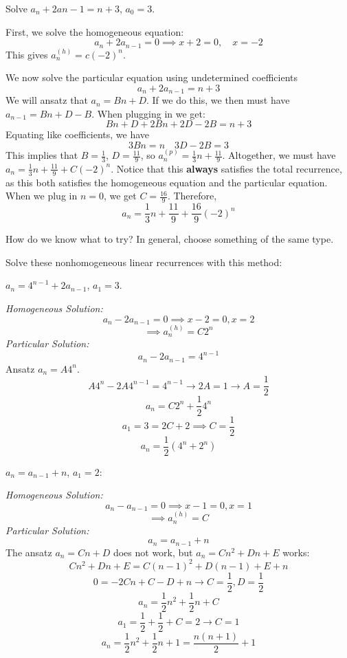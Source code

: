 \documentclass[11pt,twosided]{article}
\begin{document}
\begin{problem}{3}
	Solve $a_n + 2a{n-1} = n+3$, $a_0 = 3$. 
\end{problem}

\begin{solution}
	First, we solve the homogeneous equation: 
\[
	a_n + 2a_{n-1} = 0 \implies x + 2 = 0, \quad x = -2
\]		
This gives $a_n^{(h)} = c(-2)^n$. 

We now solve the particular equation using undetermined coefficients
\[
	a_n + 2a_{n-1} = n + 3
\]
We will ansatz that $a_n = Bn + D$. If we do this, we then must have $a_{n-1} = Bn + D - B$. When plugging in we get: 
\[
	Bn + D + 2Bn + 2D - 2B = n+3
\]
Equating like coefficients, we have
\[
	3Bn = n \quad 3D - 2B = 3
\]
This implies that $B = \frac{1}{3}$, $D = \frac{11}{9}$, so $a_n^{(p)} = \frac{1}{3}n + \frac{11}{9}$. 
Altogether, we must have $a_n = \frac{1}{3}n + \frac{11}{9} + C (-2)^n$. Notice that this \textbf{always} satisfies the total recurrence, as this both satisfies the homogeneous equation and the particular equation. When we plug in $n = 0$, we get $C = \frac{16}{9}$. Therefore, 
\[
	a_n = \frac{1}{3}n + \frac{11}{9} + \frac{16}{9} (-2)^n
\]

\end{solution}

How do we know what to try? In general, choose something of the same type. 

Solve these nonhomogeneous linear recurrences with this method: 

\begin{solution}
$a_n = 4^{n-1} + 2a_{n-1}$, $a_1 = 3$. 

\textit{Homogeneous Solution: }
\[
	a_n - 2a_{n-1} = 0 \implies x - 2 = 0, x = 2
\]
\[
	\implies a_n^{(h)} = C2^n 
\]
\textit{Particular Solution: }
\[
	a_n - 2a_{n-1} = 4^{n-1} 
\]
Ansatz $a_n = A4^{n}$. 
\[
	A4^n - 2A4^{n-1} = 4^{n-1} \rightarrow 2A = 1 \rightarrow A = \frac{1}{2}
\]
\[
	a_n = C2^n + \frac{1}{2}4^n 
\]
\[
	a_1 = 3 = 2C + 2 \implies C = \frac{1}{2}
\]
\[
	a_n = \frac{1}{2}(4^n + 2^n)
\]
\end{solution}

\begin{solution}
$a_n = a_{n-1} + n$, $a_1 = 2$: 

\textit{Homogeneous Solution: }
\[
	a_n - a_{n-1} = 0 \implies x - 1 = 0, x = 1
\]
\[
	\implies a_n^{(h)} = C 
\]
\textit{Particular Solution: }
\[
	a_n = a_{n-1} + n 
\]
The ansatz $a_n = Cn + D$ does not work, but $a_n = Cn^2 + Dn + E$ works: 
\[
	Cn^2 + Dn + E = C(n-1)^2 + D(n-1) + E + n
\]
\[
	0 = -2Cn + C - D + n \rightarrow C = \frac{1}{2}, D = \frac{1}{2}
\]
\[
	a_n = \frac{1}{2}n^2 + \frac{1}{2}n + C
\]
\[
	a_1 = \frac{1}{2} + \frac{1}{2} + C = 2 \rightarrow C = 1
\]
\[
	a_n =  \frac{1}{2}n^2 + \frac{1}{2}n + 1 = \frac{n(n+1)}{2} + 1
\]
\end{solution}
\end{document}

